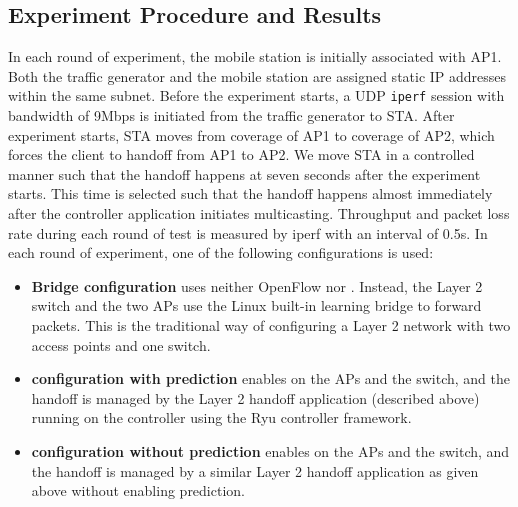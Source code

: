 \subsection{Experiment Procedure and Results}
In each round of experiment, the mobile station is initially associated with AP1. Both the traffic generator
and the mobile station are assigned static IP addresses within the same subnet. Before the experiment
starts, a UDP \texttt{iperf} session with bandwidth of 9Mbps is initiated from
the traffic generator to STA.  After experiment starts, STA moves from coverage
of AP1 to coverage of AP2, which forces the client to handoff from AP1 to AP2.
We move STA in a controlled manner such that the handoff happens at seven seconds
after the experiment starts. This time is selected such that the handoff happens
almost immediately after the controller application initiates multicasting.  Throughput
and packet loss rate during each round of test is measured by iperf with an
interval of 0.5s. In each round of experiment, one of the following
configurations is used:
\begin{itemize}
\item {\bf Bridge configuration} uses neither OpenFlow nor \aetherflow. Instead,
the Layer 2 switch and the two APs use the Linux built-in learning bridge to
forward packets. This is the traditional way of configuring a Layer 2 network
with two access points and one switch. 
\item {\bf \aetherflow configuration with prediction} enables \aetherflow on the APs and the
switch, and the handoff is managed by the Layer 2 handoff application (described
above) running on the \aetherflow controller using the Ryu controller framework.  
\item {\bf \aetherflow configuration without prediction} enables \aetherflow on the APs and the
switch, and the handoff is managed by a similar Layer 2 handoff application as given above without enabling prediction.  
\end{itemize}

